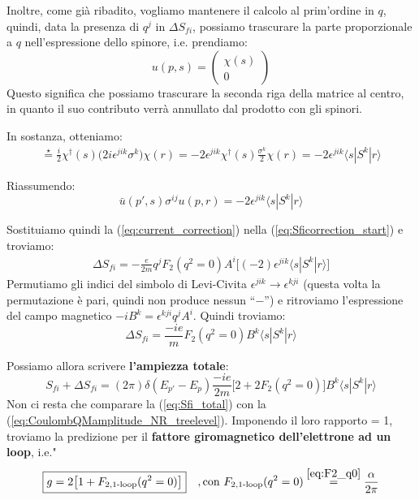 \documentclass[../main.tex]{subfiles}
\begin{document}
Inoltre, come già ribadito, vogliamo mantenere il calcolo al prim'ordine in $q$, quindi, data la presenza di $q^j$ in \(\Delta S_{fi}\), possiamo trascurare la parte proporzionale a $q$ nell'espressione dello spinore, i.e. prendiamo:
\[
u(p,s) = 
\begin{pmatrix}
    \chi(s)\\
    0
\end{pmatrix}
\]
Questo significa che possiamo trascurare la seconda riga della matrice al centro, in quanto il suo contributo verrà annullato dal prodotto con gli spinori.

In sostanza, otteniamo:
\begin{align*}
    \overset{\star}{=} \frac{i}{2}\chi^\dagger(s)\big( 2i\epsilon^{jik}\sigma^k \big) \chi(r) = -2\epsilon^{jik}\chi^\dagger(s) \frac{\sigma^k}{2} \chi(r) = -2\epsilon^{jik}\langle s | S^k | r \rangle
\end{align*}

Riassumendo:
\begin{equation}
    \boxed{\bar u(p',s) \sigma^{ij} u(p,r) = -2\epsilon^{jik}\langle s | S^k | r \rangle}
    \label{eq:current_correction}
\end{equation}

Sostituiamo quindi la (\ref{eq:current_correction}) nella (\ref{eq:Sficorrection_start}) e troviamo:
\begin{align*}
    \Delta S_{fi} = -\frac{e}{2m} q^j F_2(q^2=0) A^i \big[(-2)\epsilon^{jik}\langle s | S^k | r \rangle\big]
\end{align*}
Permutiamo gli indici del simbolo di Levi-Civita \(\epsilon^{jik}\rightarrow\epsilon^{kji}\) (questa volta la permutazione è pari, quindi non produce nessun “$-$”) e ritroviamo l'espressione del campo magnetico \(-iB^k = \epsilon^{kji}q^jA^i\).
Quindi troviamo:
\begin{equation}
    \boxed{\Delta S_{fi} = \frac{-ie}{m} F_2(q^2=0)  B^k\langle s | S^k | r \rangle}
    \label{eq:Sficorrection_end}
\end{equation}

Possiamo allora scrivere \textbf{l'ampiezza totale}:
\begin{equation}
    \boxed{S_{fi} + \Delta S_{fi} = (2\pi)\delta(E_{p'}-E_p)\frac{-ie}{2m}\Big[ 2 + 2F_2(q^2=0) \Big] B^k\langle s | S^k | r \rangle}
    \label{eq:Sfi_total}
\end{equation}
Non ci resta che comparare la (\ref{eq:Sfi_total}) con la (\ref{eq:CoulombQMamplitude_NR_treelevel}). Imponendo il loro rapporto = 1, troviamo la predizione per il \textbf{fattore giromagnetico dell'elettrone ad un loop}, i.e."
\begin{equation}
    \boxed{g=2\big[1 + F_{2,\text{1-loop}}(q^2=0)\big]}\quad , \text{con } F_{2,\text{1-loop}}(q^2=0) \overset{\ref{eq:F2_q0}}{=} \frac{\alpha}{2\pi}
\end{equation}
\end{document}
